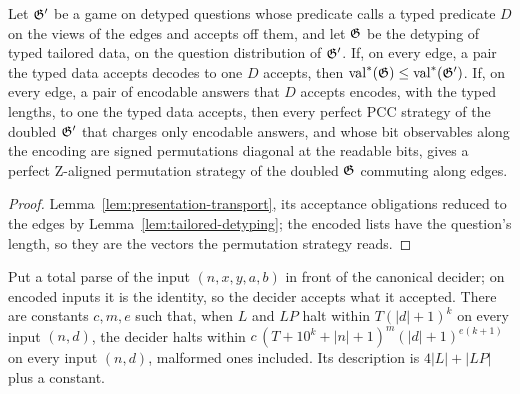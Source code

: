 \begin{lemma}
\label{lem:presentation}
\leanok
Let $\mathfrak{G}'$ be a game on detyped questions whose predicate calls a typed predicate $D$ on the
views of the edges and accepts off them, and let $\mathfrak{G}$ be the detyping of typed tailored data,
on the question distribution of $\mathfrak{G}'$. If, on every edge, a pair the typed data accepts decodes
to one $D$ accepts, then $\mathrm{val}^*(\mathfrak{G}) \le \mathrm{val}^*(\mathfrak{G}')$. If, on every edge, a
pair of encodable answers that $D$ accepts encodes, with the typed lengths, to one the typed data
accepts, then every perfect PCC strategy of the doubled $\mathfrak{G}'$ that charges only encodable
answers, and whose bit observables along the encoding are signed permutations diagonal at the
readable bits, gives a perfect Z-aligned permutation strategy of the doubled $\mathfrak{G}$ commuting
along edges.
\end{lemma}

\begin{proof}
\leanok
Lemma~\ref{lem:presentation-transport}, its acceptance obligations reduced to the edges by
Lemma~\ref{lem:tailored-detyping}; the encoded lists have the question's length, so they are the
vectors the permutation strategy reads.
\end{proof}

\begin{lemma}
\label{lem:canonical-decider-cost}
\leanok
Put a total parse of the input $(n, x, y, a, b)$ in front of the canonical decider; on encoded
inputs it is the identity, so the decider accepts what it accepted. There are constants $c, m, e$
such that, when $L$ and $LP$ halt within $T(|d| + 1)^k$ on every input $(n, d)$, the decider
halts within $c\,(T + 10^k + |n| + 1)^m (|d| + 1)^{e(k+1)}$ on every input $(n, d)$, malformed
ones included. Its description is $4|L| + |LP|$ plus a constant.
\end{lemma}

